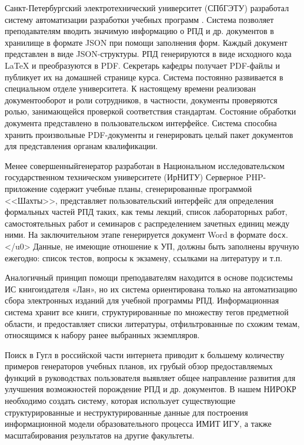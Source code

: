 \documentclass[
]{aiitart}
\begin{document}
Санкт-Петербургский электротехнический университет (СПбГЭТУ) разработал систему автоматизации разработки учебных программ \cite{leti}. Система позволяет преподавателям вводить значимую информацию о РПД и др. документов в хранилище в формате JSON при помощи заполнения форм. Каждый документ представлен в виде JSON-структуры. РПД генерируются в виде исходного кода \LaTeX{} и преобразуются в PDF. Секретарь кафедры получает PDF-файлы и публикует их на домашней странице курса. Система постоянно развивается в специальном отделе университета. К настоящему времени реализован документооборот и роли сотрудников, в частности, документы проверяются ролью, занимающейся проверкой соответствия стандартам. Состояние обработки документа представлено в пользовательском интерфейсе. Система способна хранить произвольные PDF-документы и генерировать целый пакет документов для представления органам квалификации.

Менее совершенныйгенератор разработан в Национальном исследовательском государственном техническом университете (ИрНИТУ) \cite{nrtu} Серверное PHP-приложение содержит учебные планы, сгенерированные программой <<Шахты>>, представляет пользовательский интерфейс для определения формальных частей РПД таких, как темы лекций, список лабораторных работ, самостоятельных работ и семинаров с распределением зачетных единиц между ними. На заключительном этапе генерируется документ Word в формате \verb|docx|.</u0> Данные, не имеющие отношение к УП, должны быть заполнены вручную ежегодно: список тестов, вопросы к экзамену, ссылками на литературу и т.п.

Аналогичный принцип помощи преподавателям находится в основе подсистемы ИС книгоиздателя «Лан», но их система ориентирована только на автоматизацию сбора электронных изданий для учебной программы РПД. Информационная система хранит все книги, структурированные по множеству тегов предметной области, и предоставляет списки литературы, отфильтрованные по схожим темам, относящимся к набору ранее выбранных экземпляров.

Поиск в Гугл в российской части интернета приводит к большему количеству примеров генераторов учебных планов, их грубый обзор предоставляемых функций в руководствах пользователя выявляет общее направление развития для улучшения возможностей порождение РПД и др. документов. В нашем НИРОКР необходимо создать систему, которая использует существующие структурированные и неструктурированные данные для построения информационной модели образовательного процесса ИМИТ ИГУ, а также масштабирования результатов на другие факультеты.
\end{document}
